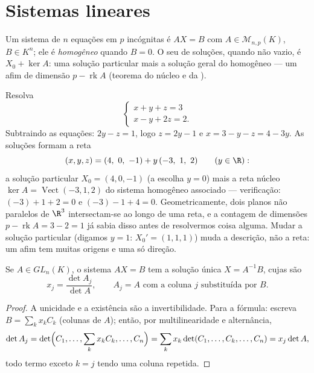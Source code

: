\section{Sistemas lineares}

\begin{definition}\label{def:b1:det:system}
Um sistema  de $n$ equações em $p$
incógnitas é $AX = B$ com $A \in \mathcal{M}_{n,p}(K)$, $B \in
K^n$; ele é \emph{homogêneo}
quando $B = 0$. O seu  de soluções, quando não vazio, é
$X_0 + \ker A$: uma solução particular mais a solução geral do homogêneo ---
um  afim de dimensão $p -
\operatorname{rk} A$ (teorema do núcleo e da ).
\end{definition}

\begin{example}
\label{ex:b1:det:affinestructure}
Resolva
\[
\begin{cases}
x + y + z = 3\\
x - y + 2z = 2 .
\end{cases}
\]
Subtraindo as equações: $2y - z = 1$, logo $z = 2y - 1$ e $x =
3 - y - z = 4 - 3y$. As soluções
formam a reta
\[
(x, y, z) = (4,\ 0,\ -1) + y\,(-3,\ 1,\ 2)
\qquad (y \in \R):
\]
a solução particular $X_0 = (4, 0, -1)$ (a escolha $y = 0$) mais a reta núcleo
$\ker A = \operatorname{Vect}(-3, 1, 2)$ do sistema homogêneo associado --- verificação: $(-3) + 1 + 2 = 0$ e $(-3) - 1 + 4 = 0$.
Geometricamente, dois planos não paralelos de $\R^3$ intersectam-se
ao longo de uma reta, e a contagem de dimensões $p -
\operatorname{rk} A = 3 - 2 = 1$ já sabia disso
antes de resolvermos coisa alguma. Mudar a solução particular
(digamos $y = 1$: $X_0' =
(1, 1, 1)$) muda a descrição, não a reta: um 
afim tem muitas origens e uma só direção.
\end{example}

\begin{theorem}\label{thm:b1:det:cramer}
Se $A \in GL_n(K)$, o sistema $AX = B$ tem a solução única $X =
A^{-1}B$, cujas
 são
\[
x_j = \frac{\det A_j}{\det A},
\qquad A_j = A \text{ com a coluna } j \text{ substituída por } B .
\]
\end{theorem}

\begin{proof}
A unicidade e a existência são a invertibilidade. Para a fórmula:
escreva $B = \sum_k x_k C_k$ (colunas de $A$); então, por multilinearidade e
alternância,
\[
\det A_j = \det\Bigl(C_1, \dots, \sum_k x_k C_k, \dots, C_n\Bigr)
= \sum_k x_k \det(C_1, \dots, C_k, \dots, C_n)
= x_j \det A ,
\]
todo termo exceto $k = j$ tendo uma coluna repetida.
\end{proof}

